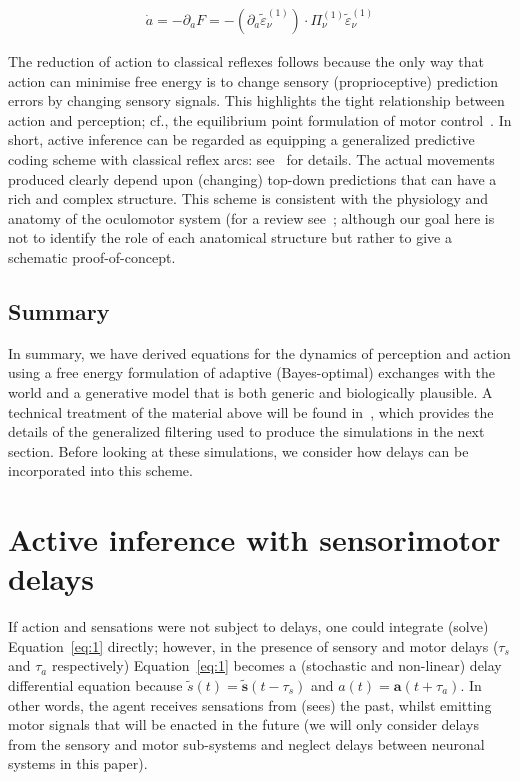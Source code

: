 \documentclass[a4paper]{article} %
\begin{document}
\begin{align}
\dot{a} =  - \partial_a F = -(\partial_a \tilde{\varepsilon}^{(1)}_\nu) \cdot \Pi^{(1)}_\nu \tilde{\varepsilon}^{(1)}_\nu  \label{eq:4} %
\end{align}%

The reduction of action to classical reflexes follows because the only
way that action can minimise free energy is to change sensory
(proprioceptive) prediction errors by changing sensory signals. This
highlights the tight relationship between action and perception; cf.,
the equilibrium point formulation of motor control~\citep{Feldman95}. In short, active inference can be regarded as equipping a
generalized predictive coding scheme with classical reflex arcs: see~\citep{Friston10a,Friston09c} for details. The actual
movements produced clearly depend upon (changing) top-down predictions
that can have a rich and complex structure. This scheme is consistent
with the physiology and anatomy of the oculomotor system (for a review
see~\citep{Ilg97,Krauzlis04}; although our goal here is not to identify
the role of each anatomical structure but rather to give a schematic
proof-of-concept.

\subsection{Summary}

In summary, we have derived equations for the dynamics of perception and
action using a free energy formulation of adaptive (Bayes-optimal)
exchanges with the world and a generative model that is both generic and
biologically plausible. A technical treatment of the material above will
be found in~\citep{Friston10d}, which provides the details of the
generalized filtering used to produce the simulations in the next
section. Before looking at these simulations, we consider how delays can
be incorporated into this scheme.

\section{Active inference with sensorimotor delays}
\label{sec:delay}
If action and sensations were not subject to delays, one could integrate
(solve) Equation~\ref{eq:1} directly; however, in the presence of sensory and
motor delays ($\tau_s$ and $\tau_a$ respectively) Equation~\ref{eq:1} becomes a (stochastic and non-linear) delay differential equation because
$\tilde{s}(t) = \bm{\tilde{s}}(t - \tau_s)$ and $a(t) = \bm{a}(t + \tau_a)$. In other words, the agent receives sensations from (sees) the past,
whilst emitting motor signals that will be enacted in the future (we
will only consider delays from the sensory and motor sub-systems and
neglect delays between neuronal systems in this paper).
\end{document}
